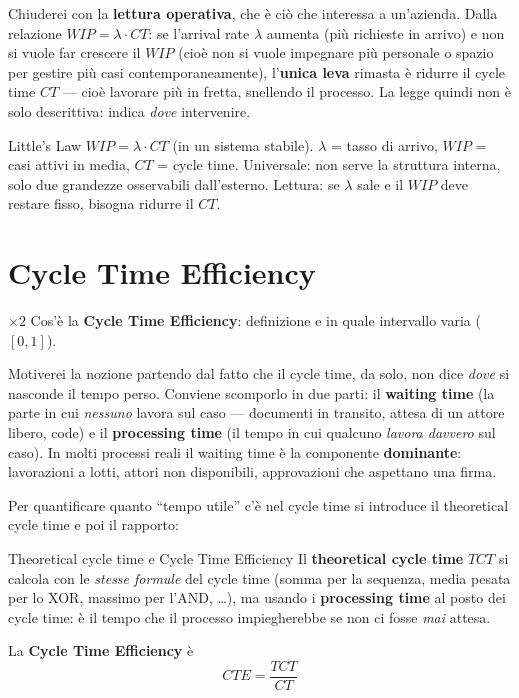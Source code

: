 Chiuderei con la \textbf{lettura operativa}, che è ciò che interessa a un'azienda. Dalla relazione $WIP = \lambda \cdot CT$: se l'arrival rate $\lambda$ aumenta (più richieste in arrivo) e non si vuole far crescere il $WIP$ (cioè non si vuole impegnare più personale o spazio per gestire più casi contemporaneamente), l'\textbf{unica leva} rimasta è ridurre il cycle time $CT$ — cioè lavorare più in fretta, snellendo il processo. La legge quindi non è solo descrittiva: indica \emph{dove} intervenire.

\begin{puntochiave}{Little's Law}
$WIP = \lambda \cdot CT$ (in un sistema stabile). $\lambda$ = tasso di arrivo, $WIP$ = casi attivi in media, $CT$ = cycle time. Universale: non serve la struttura interna, solo due grandezze osservabili dall'esterno. Lettura: se $\lambda$ sale e il $WIP$ deve restare fisso, bisogna ridurre il $CT$.
\end{puntochiave}

\section{Cycle Time Efficiency}

\begin{domanda}{$\times 2$}
Cos'è la \textbf{Cycle Time Efficiency}: definizione e in quale intervallo varia ($[0,1]$).
\end{domanda}

Motiverei la nozione partendo dal fatto che il cycle time, da solo, non dice \emph{dove} si nasconde il tempo perso. Conviene scomporlo in due parti: il \textbf{waiting time} (la parte in cui \emph{nessuno} lavora sul caso — documenti in transito, attesa di un attore libero, code) e il \textbf{processing time} (il tempo in cui qualcuno \emph{lavora davvero} sul caso). In molti processi reali il waiting time è la componente \textbf{dominante}: lavorazioni a lotti, attori non disponibili, approvazioni che aspettano una firma.

Per quantificare quanto ``tempo utile'' c'è nel cycle time si introduce il theoretical cycle time e poi il rapporto:

\begin{definizione}{Theoretical cycle time e Cycle Time Efficiency}
Il \textbf{theoretical cycle time} $TCT$ si calcola con le \emph{stesse formule} del cycle time (somma per la sequenza, media pesata per lo XOR, massimo per l'AND, \dots), ma usando i \textbf{processing time} al posto dei cycle time: è il tempo che il processo impiegherebbe se non ci fosse \emph{mai} attesa.

La \textbf{Cycle Time Efficiency} è
$$CTE = \frac{TCT}{CT}$$
\end{definizione}

